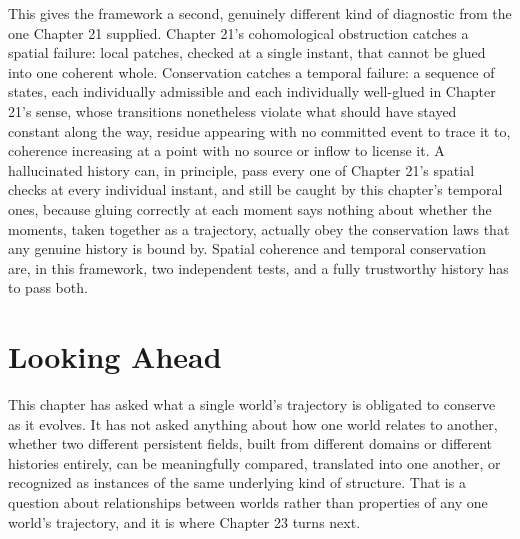 This gives the framework a second, genuinely different kind of diagnostic from the one Chapter 21 supplied. Chapter 21's cohomological obstruction catches a spatial failure: local patches, checked at a single instant, that cannot be glued into one coherent whole. Conservation catches a temporal failure: a sequence of states, each individually admissible and each individually well-glued in Chapter 21's sense, whose transitions nonetheless violate what should have stayed constant along the way, residue appearing with no committed event to trace it to, coherence increasing at a point with no source or inflow to license it. A hallucinated history can, in principle, pass every one of Chapter 21's spatial checks at every individual instant, and still be caught by this chapter's temporal ones, because gluing correctly at each moment says nothing about whether the moments, taken together as a trajectory, actually obey the conservation laws that any genuine history is bound by. Spatial coherence and temporal conservation are, in this framework, two independent tests, and a fully trustworthy history has to pass both.

\section{Looking Ahead}

This chapter has asked what a single world's trajectory is obligated to conserve as it evolves. It has not asked anything about how one world relates to another, whether two different persistent fields, built from different domains or different histories entirely, can be meaningfully compared, translated into one another, or recognized as instances of the same underlying kind of structure. That is a question about relationships between worlds rather than properties of any one world's trajectory, and it is where Chapter 23 turns next.
